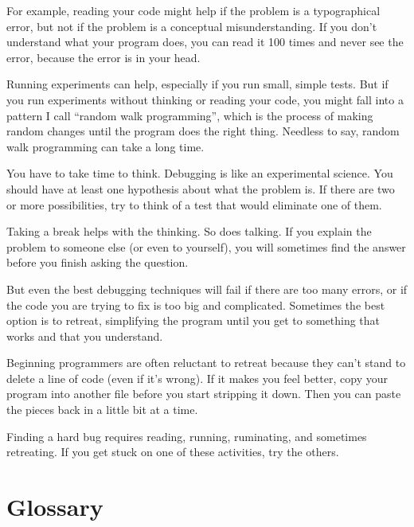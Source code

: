 For example, reading your code might help if the problem is a
typographical error, but not if the problem is a conceptual
misunderstanding.  If you don't understand what your program does, you
can read it 100 times and never see the error, because the error is in
your head.


Running experiments can help, especially if you run small, simple
tests.  But if you run experiments without thinking or reading your
code, you might fall into a pattern I call ``random walk programming'',
which is the process of making random changes until the program
does the right thing.  Needless to say, random walk programming
can take a long time.


You have to take time to think.  Debugging is like an
experimental science.  You should have at least one hypothesis about
what the problem is.  If there are two or more possibilities, try to
think of a test that would eliminate one of them.

Taking a break helps with the thinking.  So does talking.
If you explain the problem to someone else (or even to yourself), you
will sometimes find the answer before you finish asking the question.

But even the best debugging techniques will fail if there are too many
errors, or if the code you are trying to fix is too big and
complicated.  Sometimes the best option is to retreat, simplifying the
program until you get to something that works and that you
understand.

Beginning programmers are often reluctant to retreat because
they can't stand to delete a line of code (even if it's wrong).
If it makes you feel better, copy your program into another file
before you start stripping it down.  Then you can paste the pieces
back in a little bit at a time.

Finding a hard bug requires reading, running, ruminating, and
sometimes retreating.  If you get stuck on one of these activities,
try the others.


\section{Glossary}

